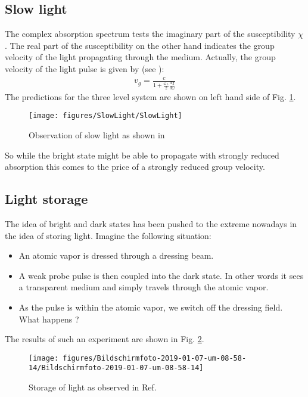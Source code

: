 \documentclass[10pt]{article}
\let\cite\citep
\providecommand\citep{\cite}
\begin{document}
\subsection{Slow light}
The complex absorption spectrum tests the imaginary part of the susceptibility $\chi$. The real part of the susceptibility on the other hand indicates the group velocity of the light propagating through the medium. Actually, the group velocity of the light pulse is given by (see \cite{Jendrzejewskia}):
\begin{align}
v_g = \frac{c}{1+\frac{\omega_L}{2}\frac{d\chi}{d\omega}}
\end{align}
The predictions for the three level system are shown on left hand side of Fig. \ref{112751}.
\begin{figure}[h!]
\begin{center}
\texttt{[image: figures/SlowLight/SlowLight]}
\caption{{Observation of slow light as shown in \protect\cite{Hau_1999}
{\label{112751}}%
}}
\end{center}
\end{figure}

So while the bright state might be able to propagate with strongly reduced absorption this comes to the price of a strongly reduced group velocity.

\subsection{Light storage}

The idea of bright and dark states has been pushed to the extreme nowadays in the idea of storing light. Imagine the following situation:
\begin{itemize}
\item An atomic vapor is dressed through a dressing beam.
\item A weak probe pulse is then coupled into the dark state. In other words it sees a transparent medium and simply travels through the atomic vapor.
\item As the pulse is within the atomic vapor, we switch off the dressing field. What happens ?
\end{itemize}
The results of such an experiment are shown in Fig. \ref{561560}.
\begin{figure}[h!]
\begin{center}
\texttt{[image: figures/Bildschirmfoto-2019-01-07-um-08-58-14/Bildschirmfoto-2019-01-07-um-08-58-14]}
\caption{{Storage of light as observed in Ref. \protect\cite{Phillips_2001}
{\label{561560}}%
}}
\end{center}
\end{figure}
\end{document}
